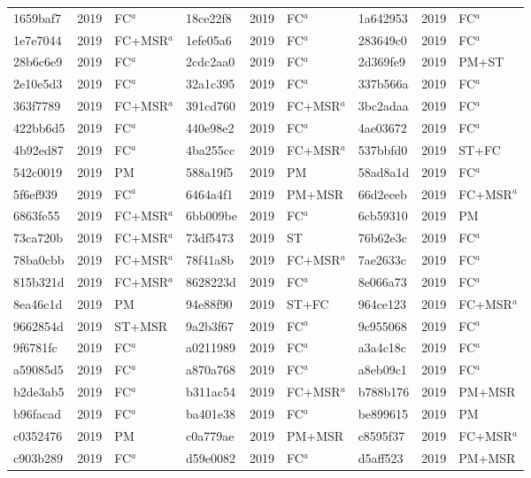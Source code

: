 \begin{longtable}{lll@{\hspace{10pt}}lll@{\hspace{10pt}}lll}
1659baf7 & 2019 & FC$^{a}$ & 18ce22f8 & 2019 & FC$^{a}$ & 1a642953 & 2019 & FC$^{a}$ \\
1e7e7044 & 2019 & FC+MSR$^{a}$ & 1efe05a6 & 2019 & FC$^{a}$ & 283649c0 & 2019 & FC$^{a}$ \\
28b6c6e9 & 2019 & FC$^{a}$ & 2cdc2aa0 & 2019 & FC$^{a}$ & 2d369fe9 & 2019 & PM+ST \\
2e10e5d3 & 2019 & FC$^{a}$ & 32a1c395 & 2019 & FC$^{a}$ & 337b566a & 2019 & FC$^{a}$ \\
363f7789 & 2019 & FC+MSR$^{a}$ & 391cd760 & 2019 & FC+MSR$^{a}$ & 3bc2adaa & 2019 & FC$^{a}$ \\
422bb6d5 & 2019 & FC$^{a}$ & 440e98e2 & 2019 & FC$^{a}$ & 4ae03672 & 2019 & FC$^{a}$ \\
4b92ed87 & 2019 & FC$^{a}$ & 4ba255cc & 2019 & FC+MSR$^{a}$ & 537bbfd0 & 2019 & ST+FC \\
542c0019 & 2019 & PM & 588a19f5 & 2019 & PM & 58ad8a1d & 2019 & FC$^{a}$ \\
5f6ef939 & 2019 & FC$^{a}$ & 6464a4f1 & 2019 & PM+MSR & 66d2eceb & 2019 & FC+MSR$^{a}$ \\
6863fe55 & 2019 & FC+MSR$^{a}$ & 6bb009be & 2019 & FC$^{a}$ & 6cb59310 & 2019 & PM \\
73ca720b & 2019 & FC+MSR$^{a}$ & 73df5473 & 2019 & ST & 76b62e3c & 2019 & FC$^{a}$ \\
78ba0cbb & 2019 & FC+MSR$^{a}$ & 78f41a8b & 2019 & FC+MSR$^{a}$ & 7ae2633c & 2019 & FC$^{a}$ \\
815b321d & 2019 & FC+MSR$^{a}$ & 8628223d & 2019 & FC$^{a}$ & 8e066a73 & 2019 & FC$^{a}$ \\
8ea46c1d & 2019 & PM & 94e88f90 & 2019 & ST+FC & 964ce123 & 2019 & FC+MSR$^{a}$ \\
9662854d & 2019 & ST+MSR & 9a2b3f67 & 2019 & FC$^{a}$ & 9c955068 & 2019 & FC$^{a}$ \\
9f6781fc & 2019 & FC$^{a}$ & a0211989 & 2019 & FC$^{a}$ & a3a4c18c & 2019 & FC$^{a}$ \\
a59085d5 & 2019 & FC$^{a}$ & a870a768 & 2019 & FC$^{a}$ & a8eb09c1 & 2019 & FC$^{a}$ \\
b2de3ab5 & 2019 & FC$^{a}$ & b311ac54 & 2019 & FC+MSR$^{a}$ & b788b176 & 2019 & PM+MSR \\
b96facad & 2019 & FC$^{a}$ & ba401e38 & 2019 & FC$^{a}$ & be899615 & 2019 & PM \\
c0352476 & 2019 & PM & c0a779ae & 2019 & PM+MSR & c8595f37 & 2019 & FC+MSR$^{a}$ \\
c903b289 & 2019 & FC$^{a}$ & d59e0082 & 2019 & FC$^{a}$ & d5aff523 & 2019 & PM+MSR \\

\end{longtable}
